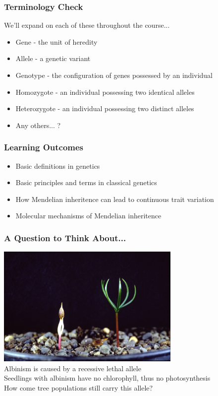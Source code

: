 \documentclass{beamer}
\begin{document}
\begin{frame}

\frametitle{Terminology Check}

We'll expand on each of these throughout the course...\\

\begin{itemize}
	\item Gene - the unit of heredity
	\item Allele - a genetic variant 
	\item Genotype - the configuration of genes possessed by an individual
	\item Homozygote - an individual possessing two identical alleles
	\item Heterozygote - an individual possessing two distinct alleles
	\item Any others... ?
	
\end{itemize}

\end{frame}

\begin{frame}
	
	\frametitle{Learning Outcomes}
	
	\Large
	\begin{itemize}
	\item   Basic definitions in genetics
	\item	Basic principles and terms in classical genetics
	\item   How Mendelian inheritence can lead to continuous trait variation 
	\item	Molecular mechanisms of Mendelian inheritence
	\end{itemize}
	
\end{frame}


\begin{frame}
	\frametitle{A Question to Think About...}
	\begin{center}
		\includegraphics[keepaspectratio,width=3.5in]{img/albino} \\
		Albinism is caused by a recessive lethal allele\\
		Seedlings with albinism have no chlorophyll, thus no photosynthesis\\
		How come tree populations still carry this allele? 
	\end{center}
\end{frame}
\end{document}
